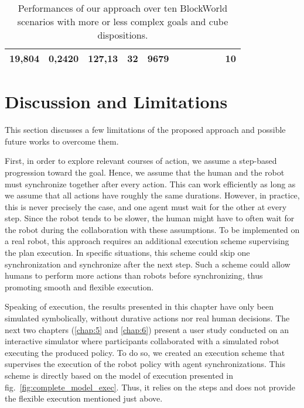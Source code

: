 \begin{sidewaystable}[]
\begin{tabular}{|c|c|c|c|c|c|c|c|c|c|c|}
    19,804                                                                  & 0,2420                                                                 & 127,13                                                               & 32                                                              & 9679                                                            &                                                                 &                                                                         &                                                                      &                                                                       &                                                                       & 10                                                             \\ \hline
    \end{tabular}
    \caption{Performances of our approach over ten BlockWorld scenarios with more or less complex goals and cube dispositions.  }
    \label{tab:performances}
\end{sidewaystable}

    
\section{Discussion and Limitations}


This section discusses a few limitations of the proposed approach and possible future works to overcome them. 

First, in order to explore relevant courses of action, we assume a step-based progression toward the goal. Hence, we assume that the human and the robot must synchronize together after every action. This can work efficiently as long as we assume that all actions have roughly the same durations. However, in practice, this is never precisely the case, and one agent must wait for the other at every step. Since the robot tends to be slower, the human might have to often wait for the robot during the collaboration with these assumptions. To be implemented on a real robot, this approach requires an additional execution scheme supervising the plan execution. In specific situations, this scheme could skip one synchronization and synchronize after the next step. Such a scheme could allow humans to perform more actions than robots before synchronizing, thus promoting smooth and flexible execution.

Speaking of execution, the results presented in this chapter have only been simulated symbolically, without durative actions nor real human decisions. The next two chapters (\ref{chap:5} and \ref{chap:6}) present a user study conducted on an interactive simulator where participants collaborated with a simulated robot executing the produced policy. To do so, we created an execution scheme that supervises the execution of the robot policy with agent synchronizations. This scheme is directly based on the model of execution presented in fig.~\ref{fig:complete_model_exec}. Thus, it relies on the steps and does not provide the flexible execution mentioned just above. 

